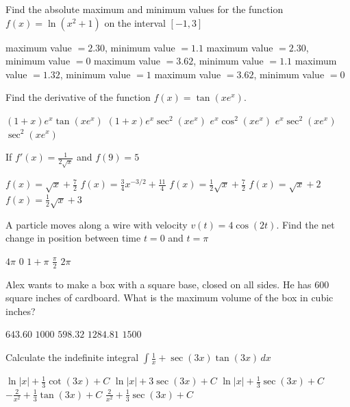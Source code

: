 \documentclass[11pt]{article}
\begin{document}
\begin{questions}
\begin{multiplechoice}{5}
\question Find the absolute maximum and minimum values for the function 
$f(x) = \ln(x^2 + 1)$ on the interval $[-1, 3]$
\begin{answers}{1}
\ans maximum value $= 2.30$, minimum value $ = 1.1$
\ans maximum value $= 2.30$, minimum value $ = 0$
\ans maximum value $= 3.62$, minimum value $ = 1.1$
\ans maximum value $= 1.32$, minimum value $ = 1$
\ans maximum value $= 3.62$, minimum value $ = 0$
\end{answers}

\newpage

\question Find the derivative of the function $f(x) = \tan(x e^x)$.
\begin{answers}{2}
\ans $(1+x)e^x \tan(xe^x) $
\ans $(1+x)e^x \sec^2(xe^x) $
\ans $e^x \cos^2(xe^x) $
\ans $e^x \sec^2(xe^x) $
\ans $\sec^2(xe^x) $
\end{answers}


\question If $f'(x) = \frac{1}{2\sqrt{x}}$ and $f(9) = 5$
\begin{answers}{2}
\ans $f(x) = \sqrt{x} + \frac{7}{2}$
\ans $f(x) = \frac{3}{4}x^{-3/2} +  \frac{11}{4}$
\ans $f(x) = \frac{1}{2}\sqrt{x} + \frac{7}{2}$
\ans $f(x) = \sqrt{x} + 2$
\ans $f(x) = \frac{1}{2}\sqrt{x} + 3$
\end{answers}


\question A particle moves along a wire with velocity $v(t) = 4\cos(2t)$.  Find the
net change in position between time $t = 0$ and $t = \pi$
\begin{answers}{2}
\ans $4\pi$
\ans $0$
\ans $1  + \pi$
\ans $\frac{\pi}{2}$
\ans $2\pi$
\end{answers}



\question Alex wants to make a box with a square base, closed on all sides.  He has 600 square inches of cardboard.  What is the maximum volume of the box in cubic inches?
\begin{answers}{3}
\ans $643.60$
\ans $1000$
\ans $598.32$
\ans $1284.81$
\ans $1500$
\end{answers}


\question Calculate the indefinite integral 
$\displaystyle \int \frac{1}{x} + \sec(3x) \tan(3x) \, dx$
\begin{answers}{2}
\ans $\ln |x| + \frac{1}{3}\cot(3x) + C$
\ans $ \ln |x| + 3 \sec(3x) + C$
\ans $\ln|x|  + \frac{1}{3}\sec(3x) + C$
\ans $-\frac{2}{x^2}  + \frac{1}{3}\tan(3x) + C$
\ans $\frac{2}{x^2} + \frac{1}{3}\sec(3x) + C$
\end{answers}



\end{multiplechoice}
\end{questions}
\end{document}
